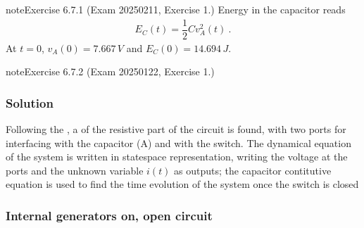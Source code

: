 \documentclass[letterpaper,10pt,english]{jupyterBook}
\begin{document}
\begin{sphinxadmonition}{note}{Exercise 6.7.1 (Exam 2025\sphinxhyphen{}02\sphinxhyphen{}11, Exercise 1.)}
\sphinxAtStartPar
{} Energy in the capacitor reads
\begin{equation*}
\begin{split}E_C(t) = \dfrac{1}{2} C v_A^2(t) \ .\end{split}
\end{equation*}
\sphinxAtStartPar
At \(t = 0\), \(v_A(0) = 7.667 \, V\) and \(E_C(0) = 14.694 \, J \).
\end{sphinxadmonition}


 \label{exercise:exam-25-01-22-exe-01}

\begin{sphinxadmonition}{note}{Exercise 6.7.2 (Exam 2025\sphinxhyphen{}01\sphinxhyphen{}22, Exercise 1.)}



\begin{figure}[htbp]
\centering

\noindent{}
\end{figure}
\subsubsection*{Solution}

\sphinxAtStartPar
Following the , a {\hyperref[\detokenize{ch/electrical-engineering-networks:classical-electromagnetism-electrical-engineering-newtork-analysis-thevenin-n-port}]{}} of the resistive part of the circuit is found, with two ports for interfacing with the capacitor (A) and with the switch. The dynamical equation of the system is written in state\sphinxhyphen{}space representation, writing the voltage at the ports and the unknown variable \(i(t)\) as outputs; the capacitor contitutive equation is used to find the time evolution of the system once the switch is closed



\begin{figure}[htbp]
\centering

\noindent{}
\end{figure}
\subsubsection*{Internal generators on, open circuit}


\end{sphinxadmonition}
\end{document}

